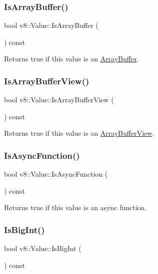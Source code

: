 \subsubsection{\texorpdfstring{Is\+Array\+Buffer()}{IsArrayBuffer()}}
{\footnotesize\ttfamily bool v8\+::\+Value\+::\+Is\+Array\+Buffer (\begin{DoxyParamCaption}{ }\end{DoxyParamCaption}) const}

Returns true if this value is an \mbox{\hyperlink{classv8_1_1ArrayBuffer}{Array\+Buffer}}. \mbox{\label{classv8_1_1Value_ab1ba4b263da3630cf8efd0c6b6e26293}} 
\subsubsection{\texorpdfstring{Is\+Array\+Buffer\+View()}{IsArrayBufferView()}}
{\footnotesize\ttfamily bool v8\+::\+Value\+::\+Is\+Array\+Buffer\+View (\begin{DoxyParamCaption}{ }\end{DoxyParamCaption}) const}

Returns true if this value is an \mbox{\hyperlink{classv8_1_1ArrayBufferView}{Array\+Buffer\+View}}. \mbox{\label{classv8_1_1Value_ade5685814ab387c1772e2d5dbd000735}} 
\subsubsection{\texorpdfstring{Is\+Async\+Function()}{IsAsyncFunction()}}
{\footnotesize\ttfamily bool v8\+::\+Value\+::\+Is\+Async\+Function (\begin{DoxyParamCaption}{ }\end{DoxyParamCaption}) const}

Returns true if this value is an async function. \mbox{\label{classv8_1_1Value_a19fe27cd498d16f014b6f40038ff96ef}} 
\subsubsection{\texorpdfstring{Is\+Big\+Int()}{IsBigInt()}}
{\footnotesize\ttfamily bool v8\+::\+Value\+::\+Is\+Big\+Int (\begin{DoxyParamCaption}{ }\end{DoxyParamCaption}) const}

